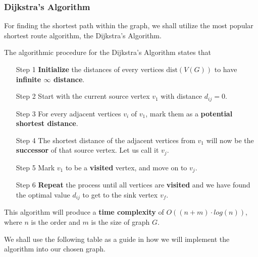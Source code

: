 \documentclass{article}
\begin{document}
	\subsubsection*{Dijkstra's Algorithm}
	For finding the shortest path within the graph, we shall utilize the most popular shortest route algorithm, the Dijkstra's Algorithm.
	\begin{algorithm}
		The algorithmic procedure for the Dijkstra's Algorithm states that
		\begin{enumerate}
			\item[Step 1] \textbf{Initialize} the distances of every vertices \(\text{dist}(V(G))\) to have \textbf{infinite \(\infty\) distance}.
			\item[Step 2] Start with the current source vertex \(v_{1}\) with distance \(d_{ij} = 0\).
			\item[Step 3] For every adjacent vertices \(v_{i}\) of \(v_{1}\), mark them as a \textbf{potential shortest distance}.
			\item[Step 4] The shortest distance of the adjacent vertices from \(v_{1}\) will now be the \textbf{successor} of that source vertex. Let us call it \(v_{j}\).
			\item[Step 5] Mark \(v_{1}\) to be a \textbf{visited} vertex, and move on to \(v_{j}\).
			\item[Step 6] \textbf{Repeat} the process until all vertices are \textbf{visited} and we have found the optimal value \(d_{ij}\) to get to the sink vertex \(v_{f}\).
		\end{enumerate} This algorithm will produce a \textbf{time complexity} of \(O((n + m)\cdot log(n))\), where \(n\) is the order and \(m\) is the size of graph \(G\).
	\end{algorithm} We shall use the following table as a guide in how we will implement the algorithm into our chosen graph.
\end{document}
